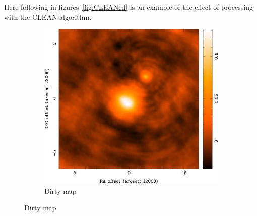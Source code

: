 Here following in figures~\ref{fig:CLEANed} is an example of the effect of processing with the CLEAN algorithm.%
\begin{figure}
        \centering
        \begin{subfigure}[b]{\textwidth}
        \centering
                \includegraphics[scale=0.6]{Figures/uv-coverage/cleanD1}
                \caption{Dirty map}
                \label{fig:dirtycl}        
        \end{subfigure}%
        

\end{figure}
